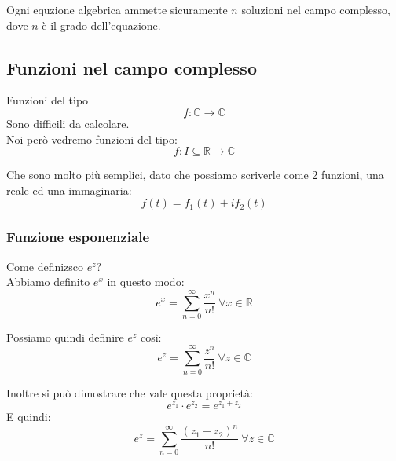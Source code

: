 \begin{teorema}
  Ogni equzione algebrica ammette sicuramente $n$ soluzioni nel campo complesso, dove $n$ è il grado dell'equazione.
\end{teorema}

\subsection{Funzioni nel campo complesso}\label{sub:funzioni_nel_campo_complesso}

Funzioni del tipo
\begin{equation}
  f: \mathbb{C}\to \mathbb{C}
\end{equation}
Sono difficili da calcolare. \\

Noi però vedremo funzioni del tipo:
\begin{equation}
  f: I\subseteq \mathbb{R}\to \mathbb{C}
\end{equation}

Che sono molto più semplici, dato che possiamo scriverle come 2 funzioni, una reale ed una immaginaria:
\begin{equation}
  f(t)=f_1(t)+if_2(t)
\end{equation}

\subsubsection{Funzione esponenziale}\label{sec:funzione_esponenziale}

Come definizsco $e^z$? \\

Abbiamo definito $e^x$ in questo modo:
\begin{equation}
  e^x=\sum_{n=0}^{\infty}\frac{x^n}{n!}\ \forall x\in \mathbb{R}
\end{equation}

Possiamo quindi definire $e^z$ così:
\begin{equation}
  e^z=\sum_{n=0}^{\infty}\frac{z^n}{n!}\ \forall z\in \mathbb{C}
  \label{eq:e^z}
\end{equation}

Inoltre si può dimostrare che vale questa proprietà:
\begin{equation}
  e^{z_1}\cdot e^{z_2}=e^{z_1+z_2}
\end{equation}
E quindi:
\begin{equation}
  e^z=\sum_{n=0}^{\infty}\frac{(z_1+z_2)^n}{n!}\ \forall z\in \mathbb{C}
\end{equation}

